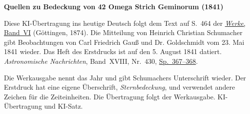 \clearpage\thispagestyle{empty}
\begin{center}\textbf{Quellen zu Bedeckung von 42 Omega Strich Geminorum (1841)}\end{center}
\noindent Diese KI-Übertragung ins heutige Deutsch folgt dem Text auf S.~464 der \href{https://gdz.sub.uni-goettingen.de/id/PPN236007467}{\textit{Werke}, Band~VI} (Göttingen, 1874). Die Mitteilung von Heinrich Christian Schumacher gibt Beobachtungen von Carl Friedrich Gauß und Dr. Goldschmidt vom 23. Mai 1841 wieder. Das Heft des Erstdrucks ist auf den 5. August 1841 datiert. \textit{Astronomische Nachrichten}, Band~XVIII, Nr.~430, \href{https://api.digitale-sammlungen.de/iiif/image/v2/bsb10049443_00194/full/1800,/0/default.jpg}{Sp.~367--368}.
\par\smallskip\noindent Die Werkausgabe nennt das Jahr und gibt Schumachers Unterschrift wieder. Der Erstdruck hat eine eigene Überschrift, \textit{Sternbedeckung}, und verwendet andere Zeichen für die Zeiteinheiten. Die Übertragung folgt der Werkausgabe. KI-Übertragung und KI-Satz.
\clearpage
